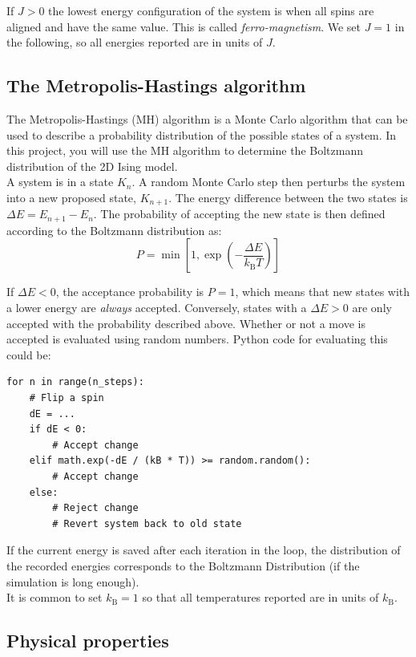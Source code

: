 \documentclass{article}
\begin{document}
If $J > 0$ the lowest energy configuration of the system is when all spins are aligned and have the same value.
This is called \textit{ferro-magnetism}.
We set $J = 1$ in the following, so all energies reported are in units of $J$.

\subsection{The Metropolis-Hastings algorithm}

The Metropolis-Hastings (MH) algorithm is a Monte Carlo algorithm that can be used to describe a probability distribution of the possible states of a system.
In this project, you will use the MH algorithm to determine the Boltzmann distribution of the 2D Ising model.\\

A system is in a state $K_n$.
A random Monte Carlo step then perturbs the system into a new proposed state, $K_{n+1}$.
The energy difference between the two states is $\Delta E = E_{n+1} - E_n$.
The probability of accepting the new state is then defined according to the Boltzmann distribution as:
\begin{equation}
P = \min \left[1, \exp \left(-\frac{\Delta E}{k_{\mathrm{B}}T}\right) \right]
\end{equation} 

If $\Delta E < 0$, the acceptance probability is $P = 1$, which means that new states with a lower energy are \textit{always} accepted.
Conversely, states with a $\Delta E > 0 $ are only accepted with the probability described above.
Whether or not a move is accepted is evaluated using random numbers.
Python code for evaluating this could be:
\begin{lstlisting}
for n in range(n_steps):
    # Flip a spin
    dE = ...
    if dE < 0:
        # Accept change
    elif math.exp(-dE / (kB * T)) >= random.random():
        # Accept change
    else:
        # Reject change
        # Revert system back to old state
\end{lstlisting}

If the current energy is saved after each iteration in the loop, the distribution of the recorded energies corresponds to the Boltzmann Distribution (if the simulation is long enough).\\

It is common to set $k_{\mathrm{B}} = 1$ so that all temperatures reported are in units of $k_{\mathrm{B}}$.

\newpage
\subsection{Physical properties}
\end{document}
